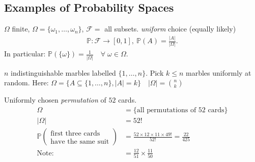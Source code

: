 \subsection{Examples of Probability Spaces}

\begin{example}
    $\Omega$ finite, $\Omega = \{\omega_1, \dots, \omega_n\}$, $\mathcal{F} =$ all subsets.
    \emph{uniform} choice (equally likely)
    \begin{align*}
        \mathbb{P} : \mathcal{F} \to [0, 1],\ \mathbb{P}(A) = \frac{|A|}{|\Omega|}.
    \end{align*} 
    In particular: $\mathbb{P}(\{\omega\}) = \frac{1}{|\Omega|} \quad \forall \;\omega \in \Omega$.
\end{example} 

\begin{example}
    $n$ indistinguishable marbles labelled $\{1, \dots, n\}$.
    Pick $k \leq n$ marbles uniformly at random.
    Here: $\Omega = \{A \subseteq \{1, \dots, n\}, |A| = k\} \quad |\Omega| = \binom{n}{k}$
\end{example} 

\begin{example}
    Uniformly chosen \emph{permutation} of $52$ cards.
    \begin{align*}
        \Omega &= \{ \text{all permutations of 52 cards} \} \\
        |\Omega| &= 52! \\
        \mathbb{P}(\substack{\text{first three cards} \\ \text{have the same suit}}) &= \frac{52 \times 12 \times 11 \times 49!}{52!} = \frac{22}{425} \\
        \text{Note:} &= \frac{12}{51} \times \frac{11}{50}
    \end{align*} 
\end{example}

